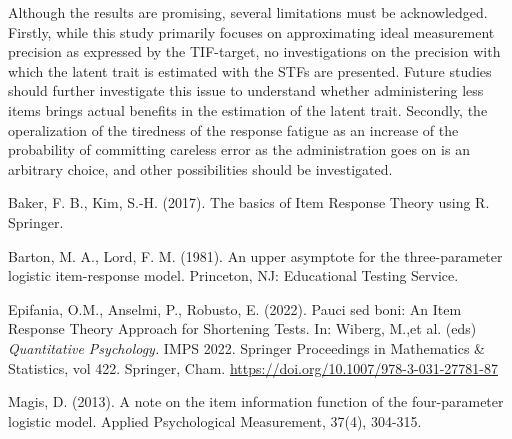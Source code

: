 \documentclass{svproc}
\begin{document}
Although the results are promising, several limitations must be acknowledged. Firstly, while this study primarily focuses on approximating ideal measurement precision as expressed by the TIF-target, no investigations on the precision with which the latent trait is estimated with the STFs are presented. Future studies should further investigate this issue to understand whether administering less items brings actual benefits in the estimation of the latent trait.
Secondly, the operalization of the tiredness of the response fatigue as an increase of the probability of committing careless error as the administration goes on is an arbitrary choice, and other possibilities should be investigated.




%
\begin{thebibliography}{6}
%

 Baker, F. B., Kim, S.-H. (2017). The basics of Item Response Theory using R. Springer.

Barton, M. A., Lord, F. M. (1981). An upper asymptote for the three-parameter logistic item-response
model. Princeton, NJ: Educational Testing Service.



Epifania, O.M., Anselmi, P., Robusto, E. (2022). Pauci sed boni: An Item Response Theory Approach for Shortening Tests. In: Wiberg, M.,et al. (eds) \textit{Quantitative Psychology.} IMPS 2022. Springer Proceedings in Mathematics \& Statistics, vol 422. Springer, Cham. \url{https://doi.org/10.1007/978-3-031-27781-87}



Magis, D. (2013). A note on the item information function of the four-parameter logistic model. Applied Psychological Measurement, 37(4), 304-315.






\end{thebibliography}
\end{document}
